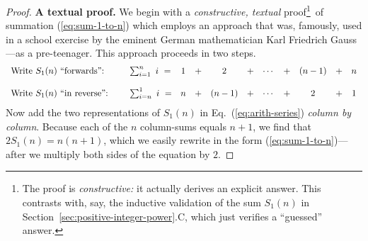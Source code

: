 
 
\begin{proof}
{\bf A textual proof.}
We begin with a {\em constructive, textual} proof\footnote{The proof is {\em constructive:} it actually derives an explicit answer.  This contrasts with, say, the inductive validation of the sum $S_1(n)$ in Section~\ref{sec:positive-integer-power}.C, which just verifies a ``guessed'' answer.}~of summation (\ref{eq:sum-1-to-n}) which employs an approach that was, famously,  used in a school exercise by the eminent German mathematician Karl Friedrich Gauss---as a pre-teenager.  This approach proceeds in two steps.
\begin{equation}
\label{eq:arith-series}
\begin{array}{llccccccccc}
\mbox{Write $S_1(n)$ ``forwards'':} &
\hspace*{.2in}\sum_{i=1}^n \ i \ = & 1 & + & 2   & + & \cdots & + & (n-1) & + & n \\
 & & & & & & & & & &  \\
\mbox{Write $S_1(n)$ ``in reverse'':} &
\hspace*{.2in}\sum_{i=n}^1 \ i \ = & n & + & (n-1) & + & \cdots & + & 2   & + & 1
\end{array}
\end{equation}
Now add the two representations of $S_1(n)$ in Eq.~(\ref{eq:arith-series}) {\em column by column}.  Because each of the $n$ column-sums equals $n+1$, we find that $2 S_1(n) = n(n+1)$, which we easily rewrite in the form (\ref{eq:sum-1-to-n})---after we multiply both sides of the equation by $2$.
\end{proof}

\medskip
\noindent {}

